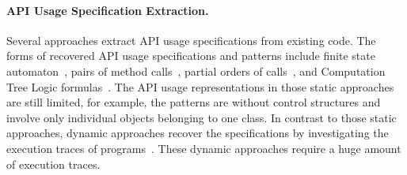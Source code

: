 \paragraph{{API Usage Specification Extraction.}} 
Several approaches extract API usage specifications from existing code. The forms of recovered API usage specifications and patterns include finite state automaton~\cite{zeller07,doc2spec}, pairs of method calls~\cite{Livshits2005,williams-tse05}, partial orders of calls~\cite{mapo-fse07,taoxie-ase09}, and Computation Tree Logic formulas~\cite{zeller-ase09}. The API usage representations in those static approaches are still limited, for example, the patterns are without control structures and involve only individual objects belonging to one class. In contrast to those static approaches, dynamic approaches recover the specifications by investigating the execution traces of programs~\cite{javert,perracotta,shoham-issta07,ramanathan-isce07,mike-ase09}. These dynamic approaches require a huge amount of execution traces.  
 
